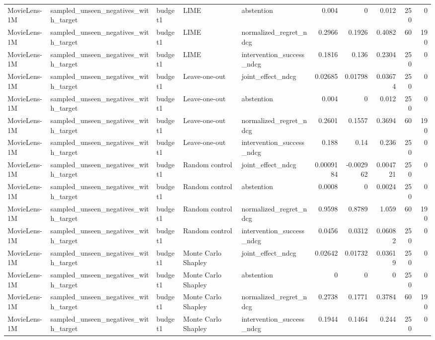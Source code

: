 \begin{table}[t]
{\begin{tabular}{lllllrrrrr}
MovieLens-1M & sampled\_unseen\_negatives\_with\_target & budget1 & LIME & abstention & 0.004 & 0 & 0.012 & 250 & 0 \\
MovieLens-1M & sampled\_unseen\_negatives\_with\_target & budget1 & LIME & normalized\_regret\_ndcg & 0.2966 & 0.1926 & 0.4082 & 60 & 190 \\
MovieLens-1M & sampled\_unseen\_negatives\_with\_target & budget1 & LIME & intervention\_success\_ndcg & 0.1816 & 0.136 & 0.2304 & 250 & 0 \\
MovieLens-1M & sampled\_unseen\_negatives\_with\_target & budget1 & Leave-one-out & joint\_effect\_ndcg & 0.02685 & 0.01798 & 0.03674 & 250 & 0 \\
MovieLens-1M & sampled\_unseen\_negatives\_with\_target & budget1 & Leave-one-out & abstention & 0.004 & 0 & 0.012 & 250 & 0 \\
MovieLens-1M & sampled\_unseen\_negatives\_with\_target & budget1 & Leave-one-out & normalized\_regret\_ndcg & 0.2601 & 0.1557 & 0.3694 & 60 & 190 \\
MovieLens-1M & sampled\_unseen\_negatives\_with\_target & budget1 & Leave-one-out & intervention\_success\_ndcg & 0.188 & 0.14 & 0.236 & 250 & 0 \\
MovieLens-1M & sampled\_unseen\_negatives\_with\_target & budget1 & Random control & joint\_effect\_ndcg & 0.0009184 & -0.002962 & 0.004721 & 250 & 0 \\
MovieLens-1M & sampled\_unseen\_negatives\_with\_target & budget1 & Random control & abstention & 0.0008 & 0 & 0.0024 & 250 & 0 \\
MovieLens-1M & sampled\_unseen\_negatives\_with\_target & budget1 & Random control & normalized\_regret\_ndcg & 0.9598 & 0.8789 & 1.059 & 60 & 190 \\
MovieLens-1M & sampled\_unseen\_negatives\_with\_target & budget1 & Random control & intervention\_success\_ndcg & 0.0456 & 0.0312 & 0.06082 & 250 & 0 \\
MovieLens-1M & sampled\_unseen\_negatives\_with\_target & budget1 & Monte Carlo Shapley & joint\_effect\_ndcg & 0.02642 & 0.01732 & 0.03619 & 250 & 0 \\
MovieLens-1M & sampled\_unseen\_negatives\_with\_target & budget1 & Monte Carlo Shapley & abstention & 0 & 0 & 0 & 250 & 0 \\
MovieLens-1M & sampled\_unseen\_negatives\_with\_target & budget1 & Monte Carlo Shapley & normalized\_regret\_ndcg & 0.2738 & 0.1771 & 0.3784 & 60 & 190 \\
MovieLens-1M & sampled\_unseen\_negatives\_with\_target & budget1 & Monte Carlo Shapley & intervention\_success\_ndcg & 0.1944 & 0.1464 & 0.244 & 250 & 0 \\

\end{tabular}}
\end{table}
